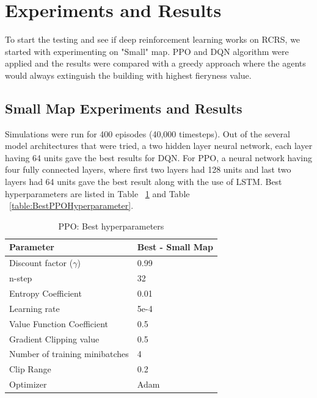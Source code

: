 \documentclass[12pt]{report}
\begin{document}
\section{Experiments and Results} \label{Experiments}

To start the testing and see if deep reinforcement learning works on RCRS, we started with experimenting on "Small" map. PPO and DQN algorithm were applied and the results were compared with a greedy approach where the agents would always extinguish the building with highest fieryness value. 

\subsection{Small Map Experiments and Results}

Simulations were run for 400 episodes (40,000 timesteps). Out of the several model architectures that were tried, a two hidden layer neural network, each layer having 64 units gave the best results for DQN. For PPO, a neural network having four fully connected layers, where first two layers had 128 units and last two layers had 64 units gave the best result along with the use of LSTM. Best hyperparameters are listed in Table ~\ref{table:BestDQNHyperparameter}
and Table ~\ref{table:BestPPOHyperparameter}. 

\begin{table} [!h]
\begin{center}
 \begin{tabular}{l | l} 
 \hline
 Parameter & Best - Small Map  \\ [0.5ex] 
 \hline\hline
 Discount factor ($\gamma$) & 0.99  \\
 n-step & 32\\
 Entropy Coefficient & 0.01\\
 Learning rate & 5e-4\\
 Value Function Coefficient & 0.5\\
 Gradient Clipping value &  0.5\\
 Number of training minibatches & 4\\
 Clip Range & 0.2\\
 Optimizer & Adam  \\ 
 \hline
\end{tabular}
\caption{PPO: Best hyperparameters}
\label{table:BestDQNHyperparameter}
\end{center}
\end{table}
\end{document}
